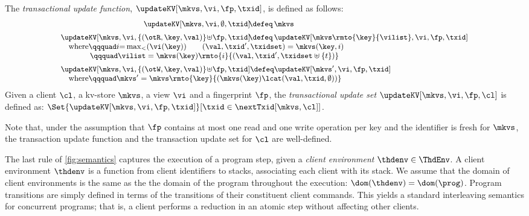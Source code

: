 \begin{definition}
\label{eq:updatekv}
\label{def:updatekv}
The \emph{transactional update function},  $\updateKV[\mkvs, \vi, \fp, \txid]$,  is
defined as follows:
%
{%
\[%
\small
\begin{array}{@{} l @{}}
	\begin{array}{@{} r @{} l @{}}
		\updateKV[\mkvs, \vi, \emptyset, \txid] \!\defeq\,  & \mkvs \vspace{5pt}\\
        \updateKV[\mkvs, \vi, \{(\otR, \key, \val)\} \!\uplus\! \fp, \txid]
	    \!\defeq\, & 
        \updateKV[\mkvs\rmto{\key}{\vilist},\vi, \fp, \txid]
	\end{array}\\
%	
	\quad\text{where} 
	\qqquad 
	i {=} \max_{<}(\vi(\key)) \qquad (\val, \txid', \txidset) = \mkvs(\key, i) \\
	\quad\phantom{where} 
	\qqquad 
	\vilist = \mkvs(\key)\rmto{i}{(\val, \txid', \txidset \uplus \{ t \})} \vspace{5pt}\\
%	
	\updateKV[\mkvs, \vi, \{(\otW, \key, \val)\} \!\uplus\! \fp, \txid] 
    	\defeq
    \updateKV[\mkvs', \vi, \fp, \txid] \\
%
 	\quad\text{where} 
	\qqquad 
	\mkvs' = \mkvs\rmto{\key}{ ( \mkvs(\key) \lcat (\val, \txid, \emptyset) ) }   
\end{array}
\]%
}%
%
Given a client $\cl$, a kv-store $\mkvs$, a view $\vi$ and a fingerprint $\fp$, 
the \emph{transactional update set} $\updateKV[\mkvs, \vi, \fp, \cl]$ is defined as:  
\(\Set{\updateKV[\mkvs, \vi, \fp, \txid]}[\txid \in \nextTxid[\mkvs, \cl]]\).
\end{definition}

Note that,  under the assumption that $\fp$ contains at most one read and one write 
operation per key and the identifier is fresh for $\mkvs$, 
the transaction update function and the transaction update set for
$\cl$ are well-defined. 

The last rule of \cref{fig:semantics} captures the execution of a program step, 
given a \emph{client environment} $\thdenv \in \ThdEnv$. 
A client environment $\thdenv$ is a function from client identifiers to stacks, associating each client with its stack. 
We assume that the domain of client environments is the same as the
the domain of the program throughout the execution: 
$\dom(\thdenv) = \dom(\prog)$.
Program transitions are simply defined in terms of the transitions of
their constituent client commands. 
This  yields a  standard interleaving semantics for concurrent
programs; 
that is, 
a client performs a reduction in an atomic step without
affecting other clients. 
